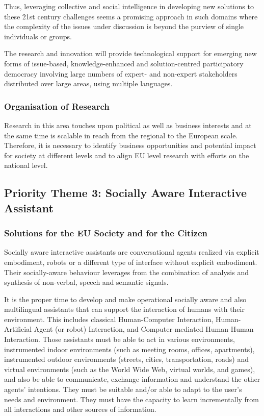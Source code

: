 \documentclass[10pt, plain]{../../metanetpaper}
\begin{document}
\begin{multicols}{2}
Thus, leveraging collective and social intelligence in developing new solutions to these 21st century challenges seems a promising approach in such domains where the complexity of the issues under discussion is beyond the purview of single individuals or groups.

The research and innovation will provide technological support for emerging new forms of issue-based, knowledge-enhanced and solution-centred participatory democracy involving large numbers of expert- and non-expert stakeholders distributed over large areas, using multiple languages.

\subsubsection{Organisation of Research}
\label{sec:organ-rese-pt2}

Research in this area touches upon political as well as business interests and at the same time is scalable in reach from the regional to the European scale. Therefore, it is necessary to identify business opportunities and potential impact for society at different levels and to align EU level research with efforts on the national level.

\subsection{Priority Theme 3: Socially Aware Interactive Assistant}
\label{sec:priority-theme-3-interactive-assistant}

\subsubsection{Solutions for the EU Society and for the Citizen}
\label{sec:solutions-eu-society-pt3}

Socially aware interactive assistants are conversational agents realized via explicit embodiment, robots or a different type of interface without explicit embodiment. Their socially-aware behaviour leverages from the combination of analysis and synthesis of non-verbal, speech and semantic signals.
 
It is the proper time to develop and make operational socially aware and also multilingual assistants that can support the interaction of humans with their environment. This includes classical Human-Computer Interaction, Human-Artificial Agent (or robot) Interaction, and Computer-mediated Human-Human Interaction. Those assistants must be able to act in various environments, instrumented indoor environments (such as meeting rooms, offices, apartments), instrumented outdoor environments (streets, cities, transportation, roads) and virtual environments (such as the World Wide Web, virtual worlds, and games), and also be able to communicate, exchange information and understand the other agents’ intentions. They must be suitable and/or able to adapt to the user’s needs and environment. They must have the capacity to learn incrementally from all interactions and other sources of information.
 

\end{multicols}
\end{document}
